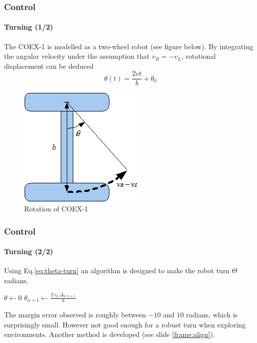 \documentclass[10pt]{beamer}
\begin{document}

\begin{frame}[label={frame:control-turn}]
\frametitle{Control}
\framesubtitle{Turning (1/2)}
The COEX-1 is modelled as a two-wheel robot (see figure below). By integrating the angular velocity under the assumption that $v_R = -v_L$, rotational displacement can be deduced
\begin{equation}\label{eq:theta-turn}
\theta(t) = \frac{2vt}{b} + \theta_0
\end{equation}
\begin{figure}[hbtp]
\centering
\label{fig:model-turn}
\includegraphics[scale=0.45]{figures/differential-system.jpg}
\caption{Rotation of COEX-1}
\end{figure}
\end{frame}


\begin{frame}
\frametitle{Control}
\framesubtitle{Turning (2/2)}
Using Eq.\ref{eq:theta-turn} an algorithm is designed to make the robot turn $\Theta$ radians.
\vspace*{8mm}
\begin{algorithmic}[1]
\State $\theta\gets 0$
\State {}
\While{$\theta < \Theta$}
\State $\theta_{n+1} \gets \frac{2\, v_n\, \Delta_{n:n+1}}{b}$
\EndWhile
\State {}
\EndProcedure
\end{algorithmic}
\vspace*{8mm}
The margin error observed is roughly between $-10$ and $10$ radians, which is surprisingly small. However not good enough for a robust turn when exploring environments. Another method is developed (see slide \ref{frame:align}).
\end{frame}
\end{document}
